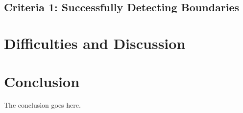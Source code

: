 \documentclass[10pt,journal,letterpaper,compsoc]{IEEEtran}
\begin{document}
\subsection{Criteria 1: Successfully Detecting Boundaries}

\section{Difficulties and Discussion}
\label{sec:difficulties}

\section{Conclusion}
\label{sec:concl}
The conclusion goes here.










\end{document}
